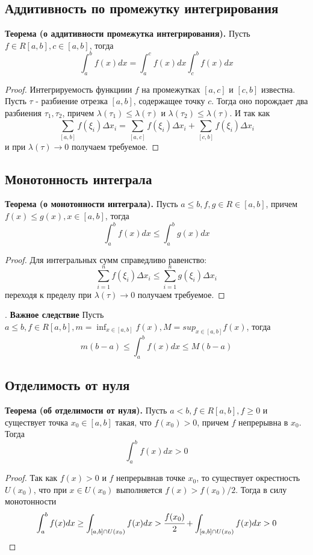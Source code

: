 \documentclass{article}
\newcommand*{\theorem}[2]{\textbf{Теорема #1. } #2 \newline}
\begin{document}
\subsection{Аддитивность по промежутку интегрирования}
\theorem{(о аддитивности промежутка интегрирования)}{Пусть $f \in R[a, b], c \in [a, b]$, тогда}
$$
    \int_{a}^{b} f(x)dx = \int_{a}^{c} f(x)dx \int_{c}^{b} f(x)dx
$$
\begin{proof}
    Интегрируемость функциии $f$ на промежутках $[a, c]$ и $[c, b]$ известна. Пусть $\tau$ - разбиение отрезка $[a, b]$, содержащее точку $c$. Тогда оно порождает два разбиения $\tau_1, \tau_2$, причем $\lambda(\tau_1) \leq \lambda(\tau)$ и $\lambda(\tau_2) \leq \lambda(\tau)$. И так как
    $$
        \sum_{[a, b]}^{} f(\xi_i)\Delta x_i = \sum_{[a, c]}^{}f(\xi_i)\Delta x_i + \sum_{[c, b]}^{}f(\xi_i)\Delta x_i
    $$
    и при $\lambda(\tau) \to 0$ получаем требуемое.
\end{proof}
\subsection{Монотонность интеграла}
\theorem{(о монотонности интеграла)}{Пусть $a \leq b, f, g \in R\in[a, b]$, причем $f(x) \leq g(x), x \in [a, b]$, тогда}
$$
    \int_{a}^{b} f(x)dx \leq \int_{a}^{b} g(x)dx
$$
\begin{proof}
    Для интегральных сумм справедливо равенство: 
    $$
        \sum_{i = 1}^{n} f(\xi_i)\Delta x_i \leq \sum_{i = 1}^{n} g(\xi_i)\Delta x_i
    $$
    переходя к пределу при $\lambda(\tau) \to 0$ получаем требуемое.
\end{proof}
.\newline
\textbf{Важное  следствие}
\newline 
Пусть $a \leq b, f \in R[a, b], m = \displaystyle \inf_{x \in [a, b]} f(x), M = sup_{x\in[a,b]}f(x)$, тогда 
$$  
    m(b - a) \leq \int_{a}^{b} f(x)dx \leq M(b - a)
$$  
\subsection{Отделимость от нуля}
\theorem{(об отделимости от нуля)}{Пусть $a < b, f \in R[a, b], f \geq 0$ и существует точка $x_0 \in [a, b]$ такая, что $f(x_0) > 0$, причем $f$ непрерывна в $x_0$. Тогда}
$$
    \int_{a}^{b} f(x)dx > 0
$$
\begin{proof}
    Так как $f(x) > 0$ и $f$ непрерывнав точке $x_0$, то существует окрестность $U(x_0)$, что при $x \in U(x_0)$ выполняется $f(x) > f(x_0)/2$. Тогда в силу монотонности
    $$
        \displaystyle \int_{a}^{b} f(x)dx \geq \int_{[a, b] \cap U(x_0)}^{} f(x)dx > \cfrac{f(x_0)}{2} + \int_{[a, b] \cap U(x_0)}^{} f(x)dx > 0
    $$
\end{proof}
\end{document}

